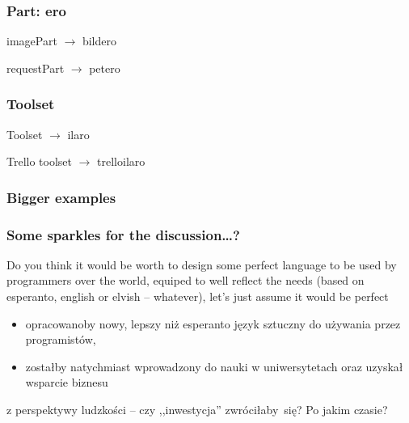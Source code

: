 \documentclass{beamer}
\begin{document}
  \begin{frame}
  	\frametitle{Part: ero}

	\begin{block}{}
		imagePart $\rightarrow$ bildero
	\end{block}
	\begin{block}{}
		requestPart $\rightarrow$ petero
	\end{block}
	
  \end{frame}
  
  \begin{frame}
  	\frametitle{Toolset}

	\begin{block}{}
		Toolset $\rightarrow$ ilaro
	\end{block}
	\begin{block}{}
		Trello toolset $\rightarrow$ trelloilaro
	\end{block}
  \end{frame}
  
  \begin{frame}
  	\frametitle{Bigger examples}
  	\begin{block}{}
  		
	\end{block}
  \end{frame}
    
  \begin{frame}
  	\frametitle{Some sparkles for the discussion\dots ?}
  	Do you think it would be worth to design some perfect language to be used by programmers over the world, equiped to well reflect the needs (based on esperanto, english or elvish -- whatever), let's just assume it would be perfect
  	\begin{itemize}
  		\item opracowanoby nowy, lepszy niż esperanto język sztuczny do używania przez programistów,
  		\item zostałby natychmiast wprowadzony do nauki w uniwersytetach oraz uzyskał wsparcie biznesu
  	\end{itemize}
  	
  	z perspektywy ludzkości -- czy ,,inwestycja'' zwróciłaby~się? Po jakim czasie?
  \end{frame}
\end{document}
